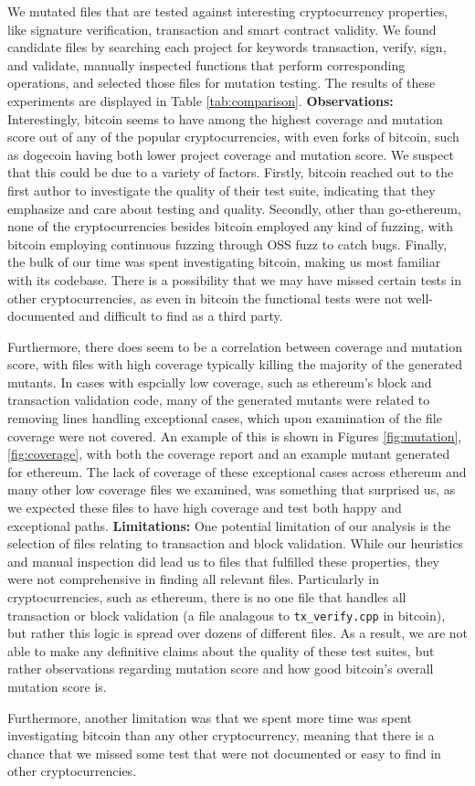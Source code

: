 We mutated files that are tested against interesting cryptocurrency properties, like signature verification, transaction and smart contract validity.
We found candidate files by searching each project for keywords transaction, verify, sign, and validate, manually inspected functions that perform corresponding operations,
and selected those files for mutation testing. The results of these experiments are displayed in Table \ref{tab:comparison}.
\newline
\newline
\noindent \textbf{Observations:} Interestingly, bitcoin seems to have among the highest coverage and mutation score out of any of the popular cryptocurrencies, with even forks of bitcoin, such as dogecoin having both lower
project coverage and mutation score. We suspect that this could be due to a variety of factors. Firstly, bitcoin reached out to the first author to investigate the quality of their test suite,
indicating that they emphasize and care about testing and quality. Secondly, other than go-ethereum, none of the cryptocurrencies besides bitcoin employed any kind of fuzzing, with bitcoin
employing continuous fuzzing through OSS fuzz to catch bugs. Finally, the bulk of our time was spent investigating bitcoin, making us most familiar with its codebase. There is a possibility
that we may have missed certain tests in other cryptocurrencies, as even in bitcoin the functional tests were not well-documented and difficult to find as a third party.

Furthermore, there does seem to be a correlation between coverage and mutation score, with files with high coverage typically killing the majority of the generated mutants. In cases with espcially
low coverage, such as ethereum's block and transaction validation code, many of the generated mutants were related to removing lines handling exceptional cases, which upon examination of the
file coverage were not covered. An example of this is shown in Figures \ref{fig:mutation}, \ref{fig:coverage}, with both the coverage report and an example mutant generated for ethereum. 
The lack of coverage of these exceptional cases across ethereum and many other low coverage files we examined, was something that surprised us, as we expected these files to have high coverage 
and test both happy and exceptional paths.
\newline
\newline
\noindent \textbf{Limitations:} One potential limitation of our analysis is the selection of files relating to transaction and block validation. While our heuristics and manual inspection did lead us to files that fulfilled these
properties, they were not comprehensive in finding all relevant files. Particularly in cryptocurrencies, such as ethereum, there is no one file that handles all transaction or block validation (a file analagous
to {\tt tx\_verify.cpp}  in bitcoin), but rather this logic is spread over dozens of different files. As a result, we are not able to make any definitive claims about the quality of these test suites, but rather
observations regarding mutation score and how good bitcoin's overall mutation score is. 

Furthermore, another limitation was that we spent more time was spent investigating bitcoin than any other cryptocurrency, meaning that there is a chance that we missed
some test that were not documented or easy to find in other cryptocurrencies.
